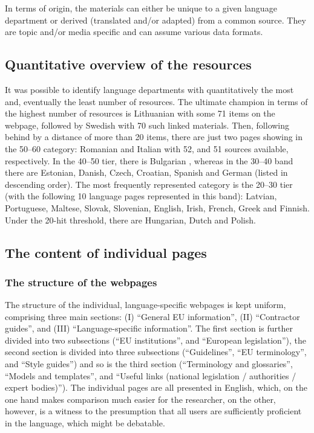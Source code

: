 \documentclass[output=paper]{langsci/langscibook}
\begin{document}
In terms of origin, the materials can either be unique to a given language department or derived (translated and/or adapted) from a common source. They are topic and/or media specific and can assume various data formats. 

\subsection{Quantitative overview of the resources}\label{sec:svoboda:4.2}

It was possible to identify language departments with quantitatively the most and, eventually the least number of resources. The ultimate champion in terms of the highest number of resources is Lithuanian with some 71 items on the webpage, followed by Swedish with 70 such linked materials. Then, following behind by a distance of more than 20 items, there are just two pages showing in the 50–60 category: Romanian and Italian with 52, and 51 sources available, respectively. In the 40–50 tier, there is Bulgarian , whereas in the 30–40 band there are Estonian, Danish, Czech, Croatian, Spanish and German (listed in descending order). The most frequently represented category is the 20–30 tier (with the following 10 language pages represented in this band): Latvian, Portuguese, Maltese, Slovak, Slovenian, English, Irish, French, Greek and Finnish. Under the 20-hit threshold, there are Hungarian, Dutch and Polish.

\subsection{The content of individual pages}\label{sec:svoboda:4.3}

\subsubsection{The structure of the webpages}\label{sec:svoboda:4.3.1}

The structure of the individual, language-specific webpages is kept uniform, comprising three main sections: (I) “General EU information”, (II) “Contractor guides”, and (III) “Language-specific information”. The first section is further divided into two subsections (“EU institutions”, and “European legislation”), the second section is divided into three subsections (“Guidelines”, “EU terminology”, and “Style guides”) and so is the third section (“Terminology and glossaries”, “Models and templates”, and “Useful links (national legislation / authorities / expert bodies)”). The individual pages are all presented in English, which, on the one hand makes comparison much easier for the researcher, on the other, however, is a witness to the presumption that all users are sufficiently proficient in the language, which might be debatable.
\end{document}
